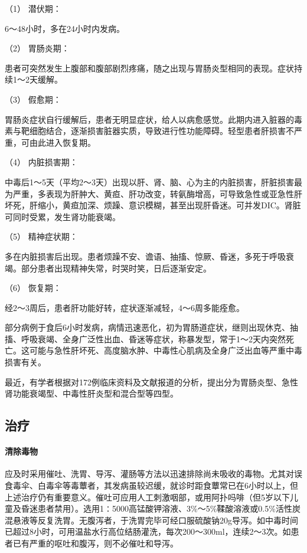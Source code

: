 \hypertarget{text00163.htmlux5cux23CHP5-7-2-2-2-4-1}{}
（1） 潜伏期：

6～48小时，多在24小时内发病。

\hypertarget{text00163.htmlux5cux23CHP5-7-2-2-2-4-2}{}
（2） 胃肠炎期：

患者可突然发生上腹部和腹部剧烈疼痛，随之出现与胃肠炎型相同的表现。症状持续1～2天缓解。

\hypertarget{text00163.htmlux5cux23CHP5-7-2-2-2-4-3}{}
（3） 假愈期：

胃肠炎症状自行缓解后，患者无明显症状，给人以病愈感觉。此期内进入脏器的毒素与靶细胞结合，逐渐损害脏器实质，导致进行性功能障碍。轻型患者肝损害不严重，可由此进入恢复期。

\hypertarget{text00163.htmlux5cux23CHP5-7-2-2-2-4-4}{}
（4） 内脏损害期：

中毒后1～5天（平均2～3天）出现以肝、肾、脑、心为主的内脏损害，肝脏损害最为严重，多表现为肝肿大、黄疸、肝功改变，转氨酶增高，可导致急性或亚急性肝坏死，肝缩小，黄疸加深、烦躁、意识模糊，甚至出现肝昏迷。可并发DIC。肾脏可同时受累，发生肾功能衰竭。

\hypertarget{text00163.htmlux5cux23CHP5-7-2-2-2-4-5}{}
（5） 精神症状期：

多在内脏损害后出现。患者烦躁不安、谵语、抽搐、惊厥、昏迷，多死于呼吸衰竭。部分患者出现精神失常，时哭时笑，日后逐渐安定。

\hypertarget{text00163.htmlux5cux23CHP5-7-2-2-2-4-6}{}
（6） 恢复期：

经2～3周后，患者肝功能好转，症状逐渐减轻，4～6周多能痊愈。

部分病例于食后6小时发病，病情迅速恶化，初为胃肠道症状，继则出现休克、抽搐、呼吸衰竭、全身广泛性出血、昏迷等症状，称暴发型，常于1～2天内突然死亡。这可能与急性肝坏死、高度脑水肿、中毒性心肌病及全身广泛出血等严重中毒损害有关。

最近，有学者根据对172例临床资料及文献报道的分析，提出分为胃肠炎型、急性肾功能衰竭型、中毒性肝炎型和混合型等四型。

\subsection{治疗}

\paragraph{清除毒物}

应及时采用催吐、洗胃、导泻、灌肠等方法以迅速排除尚未吸收的毒物。尤其对误食毒伞、白毒伞等毒蕈者，其发病虽较迟缓，就诊时距食蕈常已在6小时以上，但上述治疗仍有重要意义。催吐可应用人工刺激咽部，或用阿扑吗啡（但5岁以下儿童及昏迷患者禁用）。选用1∶5000高锰酸钾溶液、3\%～5\%鞣酸溶液或0.5\%活性炭混悬液等反复洗胃。无腹泻者，于洗胃完毕可经口服硫酸钠20g导泻。如中毒时间已超过8小时，可用温盐水行高位结肠灌洗，每次200～300ml，连续2～3次。如患者已有严重的呕吐和腹泻，则不必催吐和导泻。

